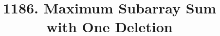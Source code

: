 \documentclass{bmcart}
\begin{document}
\begin{frontmatter}

\begin{fmbox}


\title{1186. Maximum Subarray Sum with One Deletion}


\author[
   addressref={aff1},                   %
   corref={aff1},                       %
   email={brycekille@gmail.com}   %
]{ }


\address[id=aff1]{%
  ,    %
}


\end{fmbox}
\end{frontmatter}
\end{document}
